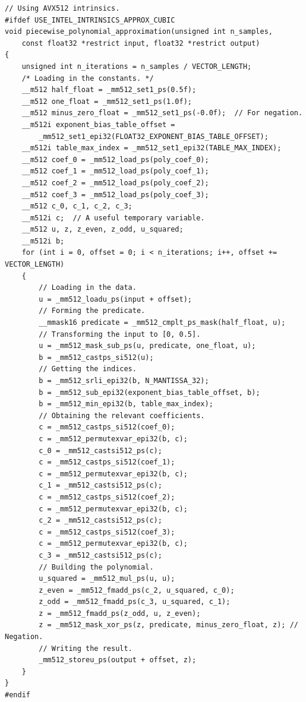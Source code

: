 \documentclass[11pt,a4paper,twoside,english]{extarticle}
\begin{document}
\begin{lstfloat}[H]
\begin{lstlisting}[style=C, captionpos=b, caption={Piecewise polynomial approximation implementations using \intel intrinsics.}, label={code:c:piecewise_polynomial_approximation_use_intel_intrinsics_approx_cubic}]
// Using AVX512 intrinsics. 
#ifdef USE_INTEL_INTRINSICS_APPROX_CUBIC
void piecewise_polynomial_approximation(unsigned int n_samples, 
    const float32 *restrict input, float32 *restrict output)
{
    unsigned int n_iterations = n_samples / VECTOR_LENGTH;  
    /* Loading in the constants. */
    __m512 half_float = _mm512_set1_ps(0.5f);
    __m512 one_float = _mm512_set1_ps(1.0f);
    __m512 minus_zero_float = _mm512_set1_ps(-0.0f);  // For negation.
    __m512i exponent_bias_table_offset = 
        _mm512_set1_epi32(FLOAT32_EXPONENT_BIAS_TABLE_OFFSET);
    __m512i table_max_index = _mm512_set1_epi32(TABLE_MAX_INDEX);
    __m512 coef_0 = _mm512_load_ps(poly_coef_0);  
    __m512 coef_1 = _mm512_load_ps(poly_coef_1);
    __m512 coef_2 = _mm512_load_ps(poly_coef_2);
    __m512 coef_3 = _mm512_load_ps(poly_coef_3);
    __m512 c_0, c_1, c_2, c_3;
    __m512i c;  // A useful temporary variable.
    __m512 u, z, z_even, z_odd, u_squared;
    __m512i b;
    for (int i = 0, offset = 0; i < n_iterations; i++, offset += VECTOR_LENGTH)
    {
        // Loading in the data.
        u = _mm512_loadu_ps(input + offset);
        // Forming the predicate.
        __mmask16 predicate = _mm512_cmplt_ps_mask(half_float, u);
        // Transforming the input to [0, 0.5].
        u = _mm512_mask_sub_ps(u, predicate, one_float, u);
        b = _mm512_castps_si512(u);  
        // Getting the indices.
        b = _mm512_srli_epi32(b, N_MANTISSA_32);
        b = _mm512_sub_epi32(exponent_bias_table_offset, b);
        b = _mm512_min_epi32(b, table_max_index);
        // Obtaining the relevant coefficients.
        c = _mm512_castps_si512(coef_0);
        c = _mm512_permutexvar_epi32(b, c);
        c_0 = _mm512_castsi512_ps(c);
        c = _mm512_castps_si512(coef_1);
        c = _mm512_permutexvar_epi32(b, c);
        c_1 = _mm512_castsi512_ps(c);
        c = _mm512_castps_si512(coef_2);
        c = _mm512_permutexvar_epi32(b, c);
        c_2 = _mm512_castsi512_ps(c);
        c = _mm512_castps_si512(coef_3);
        c = _mm512_permutexvar_epi32(b, c);
        c_3 = _mm512_castsi512_ps(c);
        // Building the polynomial.
        u_squared = _mm512_mul_ps(u, u);
        z_even = _mm512_fmadd_ps(c_2, u_squared, c_0);
        z_odd = _mm512_fmadd_ps(c_3, u_squared, c_1);
        z = _mm512_fmadd_ps(z_odd, u, z_even);
        z = _mm512_mask_xor_ps(z, predicate, minus_zero_float, z); // Negation.
        // Writing the result.
        _mm512_storeu_ps(output + offset, z);
    }
}
#endif
\end{lstlisting}
\end{lstfloat}
\clearpage
\end{document}
